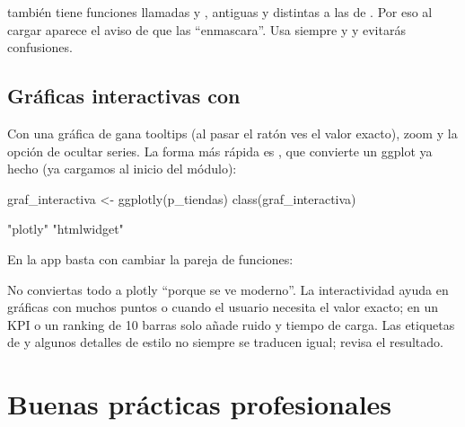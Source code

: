\begin{advertencia}
 también tiene funciones llamadas 
y , antiguas y distintas a las de . Por
eso al cargar  aparece el aviso de que las ``enmascara''. Usa
siempre  y  y evitarás
confusiones.
\end{advertencia}

\subsection{Gráficas interactivas con \texorpdfstring{}{plotly}}

Con  una gráfica de  gana tooltips (al
pasar el ratón ves el valor exacto), zoom y la opción de ocultar series. La
forma más rápida es , que convierte un ggplot ya hecho
(ya cargamos  al inicio del módulo):

\begin{rcode}
graf_interactiva <- ggplotly(p_tiendas)
class(graf_interactiva)
\end{rcode}
\begin{rsalida}
[1] "plotly"     "htmlwidget"
\end{rsalida}

En la app basta con cambiar la pareja de funciones:


\begin{consejo}
No conviertas todo a plotly ``porque se ve moderno''. La interactividad
ayuda en gráficas con muchos puntos o cuando el usuario necesita el valor
exacto; en un KPI o un ranking de 10 barras solo añade ruido y tiempo de
carga. Las etiquetas de  y algunos detalles de estilo
no siempre se traducen igual; revisa el resultado.
\end{consejo}

\section{Buenas prácticas profesionales}
\label{sec:m6-buenas-practicas}


